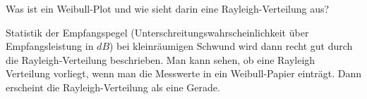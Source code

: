 \begin{question}[section=13,name={Weibull-Plot},difficulty=,quantity=,type=thr,tags={20130513}]
	Was ist ein Weibull-Plot und wie sieht darin eine Rayleigh-Verteilung aus?
	
	
\end{question}
\begin{solution}
Statistik der Empfangspegel (Unterschreitungswahrscheinlichkeit über Empfangsleistung in $dB$) bei kleinräumigen Schwund wird dann recht gut durch die Rayleigh-Verteilung beschrieben. Man kann sehen, ob eine Rayleigh Verteilung vorliegt, wenn man die Messwerte in ein Weibull-Papier einträgt. Dann erscheint die Rayleigh-Verteilung als eine Gerade.
\end{solution}